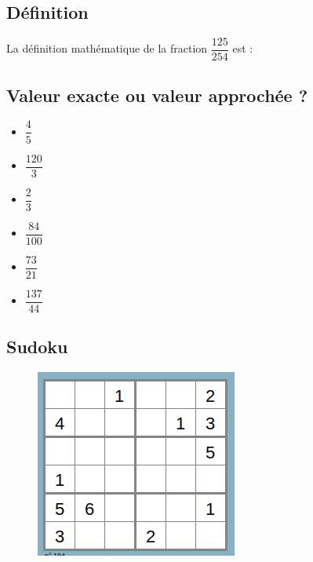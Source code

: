 \subsection*{Définition}
La définition mathématique de la fraction $\dfrac{125}{254}$ est : \dotfill \\ \Pointilles[2]

\begin{multicols}{2}
\subsection*{Valeur exacte ou valeur approchée ?}
\begin{itemize}[label={$\bullet$}]
  \item $\dfrac{4}{5}$ \dotfill \\
  \item $\dfrac{120}{3}$ \dotfill \\
  \item $\dfrac{2}{3}$ \dotfill \\
  \item $\dfrac{84}{100}$ \dotfill \\
  \item $\dfrac{73}{21}$ \dotfill \\
  \item $\dfrac{137}{44}$ \dotfill \\
\end{itemize}  \columnbreak 


\subsection*{Sudoku}
\begin{figure}[H]
  \centering
  \includegraphics[width=0.8\linewidth]{6x5-fractions/sudoku-6.png}
\end{figure}

\end{multicols}

